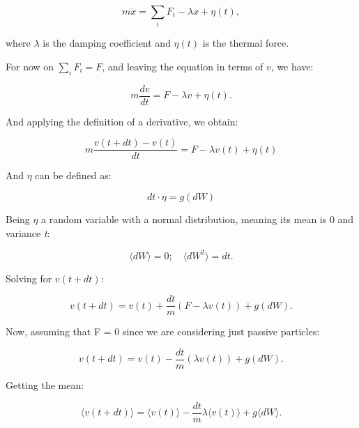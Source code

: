 \begin{equation}
m\ddot{x} = \sum_i F_i - \lambda \dot{x} + \eta (t),
  \label{eq:newton}
\end{equation}

where $\lambda$ is the damping coefficient and $\eta (t)$ is the thermal force. 

For now on $\sum_i F_i = F$, and leaving the equation in terms of $v$, we have:

\begin{equation}
m\frac{dv}{dt} = F - \lambda v + \eta (t).
  \label{eq:newtonv}
\end{equation}

And applying the definition of a derivative, we obtain:

\begin{equation}
m \frac{v(t + dt) - v(t)}{dt} = F - \lambda v(t) + \eta (t)
  \label{eq:newtonderivative}
\end{equation}

And $\eta$ can be defined as:

\begin{equation}
dt \cdot \eta = g(dW)
  \label{eq:eta}
\end{equation}

Being $\eta$ a random variable with a normal distribution, meaning its mean is 0 and variance \textit{t}:

\begin{equation}
  \langle dW \rangle = 0; \quad \langle dW ^2 \rangle = dt \text{.}
  \label{eq:meanvariance}
\end{equation}

Solving for $v(t + dt)$:

\begin{equation}
v(t +dt) = v(t) + \frac{dt}{m}(F - \lambda v(t)) + g (dW)\text{.}
  \label{eq:velocityplusone}
\end{equation}

Now, assuming that F = 0 since we are considering just passive particles:

\begin{equation}
v(t +dt) = v(t) - \frac{dt}{m}(\lambda v(t)) + g (dW)\text{.}
  \label{eq:noforce}
\end{equation}

Getting the mean:

\begin{equation}
  \langle v(t + dt) \rangle = \langle v(t) \rangle - \frac{dt}{m}\lambda \langle v(t) \rangle + g\langle dW \rangle \text{.}
  \label{eq:mean}
\end{equation}

